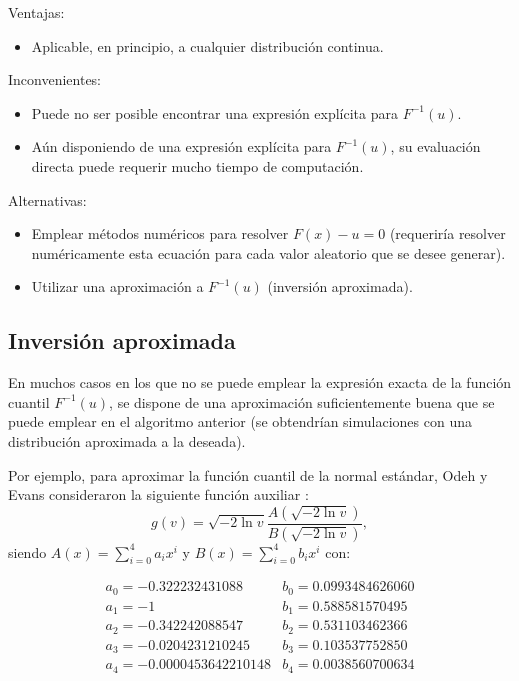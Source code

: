 \documentclass[
]{book}
\providecommand{\tightlist}{%
  \setlength{\itemsep}{0pt}\setlength{\parskip}{0pt}}
\theoremstyle{break}
\theoremstyle{definition}
\theoremstyle{definition}
\theoremstyle{definition}
\theoremstyle{remark}
\begin{document}
Ventajas:

\begin{itemize}
\tightlist
\item
  Aplicable, en principio, a cualquier distribución continua.
\end{itemize}

Inconvenientes:

\begin{itemize}
\item
  Puede no ser posible encontrar una expresión explícita para
  \(F^{-1}\left( u\right).\)
\item
  Aún disponiendo de una expresión explícita para
  \(F^{-1}\left( u\right)\), su evaluación directa puede requerir
  mucho tiempo de computación.
\end{itemize}

Alternativas:

\begin{itemize}
\item
  Emplear métodos numéricos para resolver \(F\left( x\right) -u=0\)
  (requeriría resolver numéricamente esta ecuación para cada
  valor aleatorio que se desee generar).
\item
  Utilizar una aproximación a \(F^{-1}\left( u\right)\)
  (inversión aproximada).
\end{itemize}

\hypertarget{inversiuxf3n-aproximada}{%
\subsection{Inversión aproximada}\label{inversiuxf3n-aproximada}}

En muchos casos en los que no se puede emplear la expresión exacta de la función
cuantil \(F^{-1}\left( u\right)\), se dispone de una aproximación suficientemente
buena que se puede emplear en el algoritmo anterior (se obtendrían simulaciones
con una distribución aproximada a la deseada).

Por ejemplo, para aproximar la función cuantil de la normal estándar,
Odeh y Evans consideraron la siguiente función auxiliar :
\[ g\left( v\right)  =\sqrt{-2\ln v}\frac{A\left( \sqrt{-2\ln v}\right)
}{B\left( \sqrt{-2\ln v}\right)  },\]
siendo \(A\left( x\right) =\sum_{i=0}^{4}a_{i}x^{i}\)
y \(B\left( x\right) =\sum_{i=0}^{4}b_{i}x^{i}\) con:

\[\begin{array}{ll}
a_{0}=-0.322232431088 &  b_{0}=0.0993484626060 \\
a_{1}=-1 &  b_{1}=0.588581570495 \\
a_{2}=-0.342242088547 & b_{2}=0.531103462366 \\
a_{3}=-0.0204231210245 & b_{3}=0.103537752850 \\
a_{4}=-0.0000453642210148 & b_{4}=0.0038560700634
\end{array}\]
\end{document}
